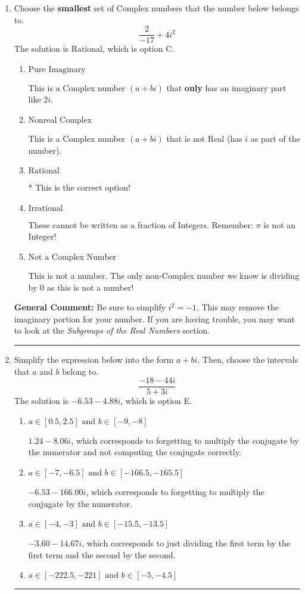 \documentclass{extbook}[14pt]
\newcommand{\litem}[1]{\item #1

\rule{\textwidth}{0.4pt}}
\begin{document}
\begin{enumerate}\litem{
Choose the \textbf{smallest} set of Complex numbers that the number below belongs to.
\[ \frac{2}{-17}+4i^2 \]
The solution is \( \text{Rational} \), which is option C.\begin{enumerate}[label=\Alph*.]
\item \( \text{Pure Imaginary} \)

This is a Complex number $(a+bi)$ that \textbf{only} has an imaginary part like $2i$.
\item \( \text{Nonreal Complex} \)

This is a Complex number $(a+bi)$ that is not Real (has $i$ as part of the number).
\item \( \text{Rational} \)

* This is the correct option!
\item \( \text{Irrational} \)

These cannot be written as a fraction of Integers. Remember: $\pi$ is not an Integer!
\item \( \text{Not a Complex Number} \)

This is not a number. The only non-Complex number we know is dividing by 0 as this is not a number!
\end{enumerate}

\textbf{General Comment:} Be sure to simplify $i^2 = -1$. This may remove the imaginary portion for your number. If you are having trouble, you may want to look at the \textit{Subgroups of the Real Numbers} section.
}
\litem{
Simplify the expression below into the form $a+bi$. Then, choose the intervals that $a$ and $b$ belong to.
\[ \frac{-18 - 44 i}{5 + 3 i} \]
The solution is \( -6.53  - 4.88 i \), which is option E.\begin{enumerate}[label=\Alph*.]
\item \( a \in [0.5, 2.5] \text{ and } b \in [-9, -8] \)

 $1.24  - 8.06 i$, which corresponds to forgetting to multiply the conjugate by the numerator and not computing the conjugate correctly.
\item \( a \in [-7, -6.5] \text{ and } b \in [-166.5, -165.5] \)

 $-6.53  - 166.00 i$, which corresponds to forgetting to multiply the conjugate by the numerator.
\item \( a \in [-4, -3] \text{ and } b \in [-15.5, -13.5] \)

 $-3.60  - 14.67 i$, which corresponds to just dividing the first term by the first term and the second by the second.
\item \( a \in [-222.5, -221] \text{ and } b \in [-5, -4.5] \)


\end{enumerate}}
\end{enumerate}
\end{document}
